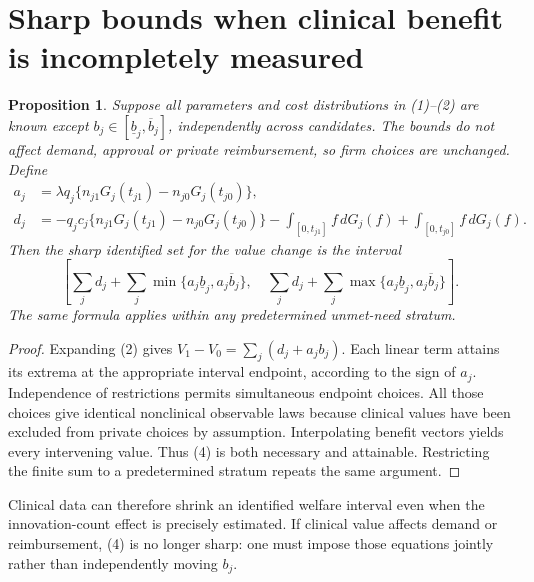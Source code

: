 \documentclass[11pt]{article}
\newtheorem{proposition}[theorem]{Proposition}
\begin{document}
\section{Sharp bounds when clinical benefit is incompletely measured}
\begin{proposition}\label{clinical}
Suppose all parameters and cost distributions in (1)--(2) are known except
$b_j\in[\underline b_j,\overline b_j]$, independently across candidates.
The bounds do not affect demand, approval or private reimbursement, so firm
choices are unchanged. Define
\begin{align*}
 a_j&=\lambda q_j\{n_{j1}G_j(t_{j1})-n_{j0}G_j(t_{j0})\},\\
 d_j&=-q_jc_j\{n_{j1}G_j(t_{j1})-n_{j0}G_j(t_{j0})\}
      -\int_{[0,t_{j1}]}f\,dG_j(f)+\int_{[0,t_{j0}]}f\,dG_j(f).
\end{align*}
Then the sharp identified set for the value change is the interval
\[
 \left[\sum_jd_j+\sum_j\min\{a_j\underline b_j,a_j\overline b_j\},\quad
       \sum_jd_j+\sum_j\max\{a_j\underline b_j,a_j\overline b_j\}\right]. \tag{4}
\]
The same formula applies within any predetermined unmet-need stratum.
\end{proposition}
\begin{proof}
Expanding (2) gives $V_1-V_0=\sum_j(d_j+a_jb_j)$. Each linear term attains
its extrema at the appropriate interval endpoint, according to the sign
of $a_j$. Independence of restrictions permits simultaneous endpoint
choices. All those choices give identical nonclinical observable laws
because clinical values have been excluded from private choices by
assumption. Interpolating benefit vectors yields every intervening value.
Thus (4) is both necessary and attainable. Restricting the finite sum to
a predetermined stratum repeats the same argument.
\end{proof}
Clinical data can therefore shrink an identified welfare interval even
when the innovation-count effect is precisely estimated. If clinical value
affects demand or reimbursement, (4) is no longer sharp: one must impose
those equations jointly rather than independently moving $b_j$.
\end{document}
